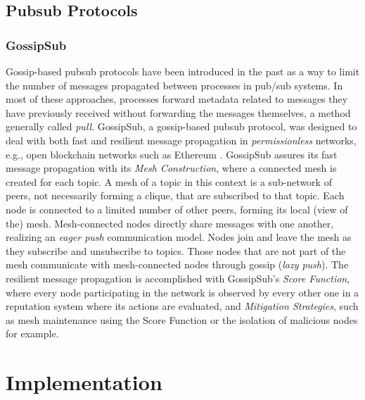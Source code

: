 \documentclass[sigconf]{acmart}
\begin{document}

\subsection{Pubsub Protocols}

\subsubsection{GossipSub} %

Gossip-based pubsub protocols have been introduced in the past as a way to limit the number of messages propagated between processes in pub/sub systems. In most of these approaches, processes forward metadata related to messages they have previously received without forwarding the messages themselves, a method generally called \textit{pull}. 
GossipSub, a gossip-based pubsub protocol, was designed to deal with both fast and resilient message propagation in \textit{permissionless} networks, e.g., open blockchain networks such as Ethereum \cite{dannen2017introducing}. 
GossipSub assures its fast message propagation with its \textit{Mesh Construction}, where a connected mesh is created for each topic. A mesh of a topic in this context is a sub-network of peers, not necessarily forming a clique, that are subscribed to that topic. Each node is connected to a limited number of other peers, forming its local (view of the) mesh. Mesh-connected nodes directly share messages with one another, realizing an \textit{eager push} communication model. Nodes join and leave the mesh as they subscribe and unsubscribe to topics. Those nodes that are not part of the mesh communicate with mesh-connected nodes through gossip (\textit{lazy push}).
The resilient message propagation is accomplished with GossipSub's \textit{Score Function}, where every node participating in the network is observed by every other one in a reputation system where its actions are evaluated, and \textit{Mitigation Strategies}, such as mesh maintenance using the Score Function or the isolation of malicious nodes for example.

\section{Implementation}
\end{document}
